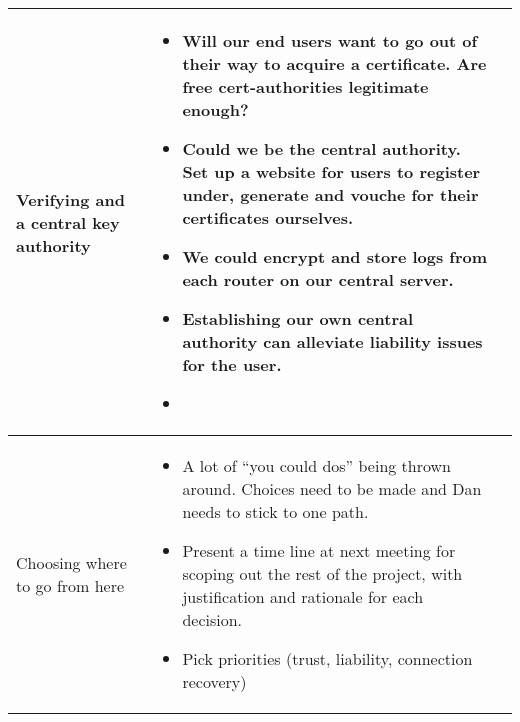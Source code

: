 \documentclass[a4wide,10pt]{extarticle}
\begin{document}
\begin{center}
\begin{tabular}{| m{3.0cm} | m{12.6cm} | m{2cm}|}
Verifying and a central key authority &
	\begin{itemize}
		\item Will our end users want to go out of their way to acquire a certificate. Are free cert-authorities legitimate enough?
		\item Could we be the central authority. Set up a website for users to register under, generate and vouche for their certificates ourselves.
		\item We could encrypt and store logs from each router on our central server. 
		\item Establishing our own central authority can alleviate liability issues for the user.
		\item 
	\end{itemize}
\\ \hline

Choosing where to go from here &
	\begin{itemize}
		\item A lot of ``you could dos'' being thrown around. Choices need to be made and Dan needs to stick to one path.
		\item Present a time line at next meeting for scoping out the rest of the project, with justification and rationale for each decision.
		\item Pick priorities (trust, liability, connection recovery)
	\end{itemize}
\\ \hline





\end{tabular}
\end{center}
\end{document}
